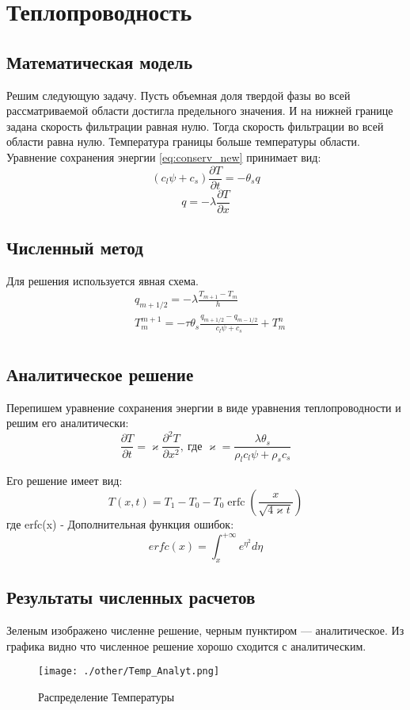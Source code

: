 \documentclass[12pt,a4paper]{article}
\newcommand{\pd}[2]{\frac{\partial #1}{\partial #2}}
\begin{document}
\section{Теплопроводность}
\subsection{Математическая модель}
Решим следующую задачу. 
Пусть объемная доля твердой фазы во всей рассматриваемой области достигла предельного значения. И на нижней границе задана скорость фильтрации равная нулю. Тогда скорость фильтрации во всей области равна нулю. Температура границы больше температуры области. Уравнение сохранения энергии \eqref{eq:conserv_new} принимает вид:
$$
(c_l \psi + c_s)\pd{T}{t} =-\theta_s q
$$
$$
q = -\lambda\pd{T}{x}
$$

\subsection{Численный метод}
Для решения используется явная схема.
\begin{equation}
\begin{aligned}
&q_{m+1/2} = - \lambda\frac{T_{m+1} - T_m}{h}\\
&T_m^{m+1} = - \tau \theta_s\frac{q_{m+1/2} - q_{m-1/2}}{c_l \psi + c_s} + T_m^n\\
\label{termal_razn}
\end{aligned}
\end{equation}
\subsection{Аналитическое решение}
Перепишем уравнение сохранения энергии в виде уравнения теплопроводности и решим его аналитически:
\begin{equation}
\pd{T}{t} = \varkappa\pd{^2 T}{x^2},\ \text{где } \varkappa = \frac{\lambda \theta_s}{\rho_l c_l \psi + \rho_s c_s}
\end{equation}

Его решение имеет вид:
\begin{equation}
T(x,t) = T_1-T_0 - T_0 \operatorname{erfc} \left(\frac{x}{\sqrt{4\varkappa t}}\right)	
\end{equation}
где erfc(x) - Дополнительная функция ошибок:
$$
erfc(x) = \int_{x}^{+\infty}e^{\eta^2}d\eta
$$
\subsection{Результаты численных расчетов}
Зеленым изображено численне решение, черным пунктиром --- аналитическое. Из графика видно что численное решение хорошо сходится с аналитическим.
\begin{figure}[h!]
\begin{center}
\texttt{[image: ./other/Temp\_Analyt.png]}
\caption{Распределение Температуры}
\end{center}
\end{figure}
\newpage
\end{document}
